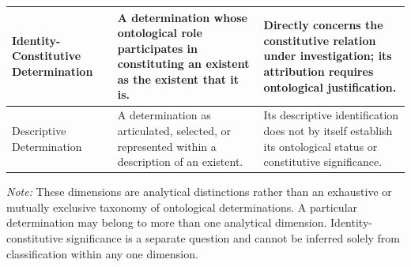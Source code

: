 \begin{table}[htbp]
\begin{tabular}{p{} p{} p{}}
Identity-Constitutive Determination
&
A determination whose ontological role participates in constituting an existent as the existent that it is.
&
Directly concerns the constitutive relation under investigation; its attribution requires ontological justification.
\\
\hline

Descriptive Determination
&
A determination as articulated, selected, or represented within a description of an existent.
&
Its descriptive identification does not by itself establish its ontological status or constitutive significance.
\\
\hline

\end{tabular}

\vspace{0.5em}

\begin{minipage}{0.92\textwidth}
\footnotesize
\textit{Note:} These dimensions are analytical distinctions rather
than an exhaustive or mutually exclusive taxonomy of ontological
determinations. A particular determination may belong to more
than one analytical dimension. Identity-constitutive significance
is a separate question and cannot be inferred solely from
classification within any one dimension.
\end{minipage}

\end{table}